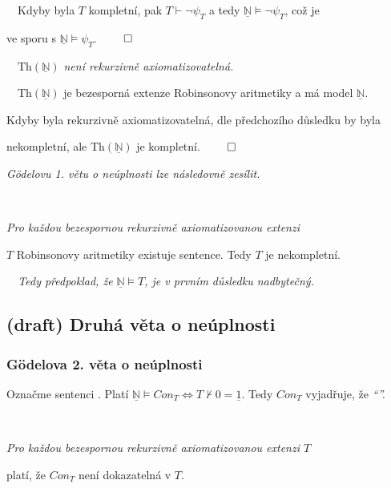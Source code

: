     \ \ Kdyby byla $T$ kompletní, pak $T\vdash \neg\psi_T$ a tedy $\underline{\mathbb{N}}\models \neg\psi_T$, což je
    \smallskip
    
    ve sporu s $\underline{\mathbb{N}}\models \psi_T$. $\qed$
    \bigskip
    
    \ \ {\it $\mathrm{Th}(\underline{\mathbb{N}})$ není rekurzivně axiomatizovatelná.}
    \medskip
    
    \ \ $\mathrm{Th}(\underline{\mathbb{N}})$ je bezesporná extenze Robinsonovy aritmetiky a má model $\underline{\mathbb{N}}$.
    \smallskip
    
    Kdyby byla rekurzivně axiomatizovatelná, dle předchozího důsledku by byla
    \smallskip
    
    nekompletní, ale $\mathrm{Th}(\underline{\mathbb{N}})$ je kompletní. $\qed$
    \bigskip
    
    {\it Gödelovu 1. větu o neúplnosti lze následovně zesílit.}
    \medskip
    
    \ \ {\it Pro každou bezespornou rekurzivně axiomatizovanou extenzi
    \smallskip
    
    $T$ Robinsonovy aritmetiky existuje  sentence. Tedy $T$ je nekompletní.}
    
    
    {\it {}\ \ Tedy předpoklad, že $\underline{\mathbb{N}}\models T$, je v prvním důsledku nadbytečný.}
    

\subsection{(draft) Druhá věta o neúplnosti}\todo

\subsubsection*{Gödelova 2. věta o neúplnosti}
    
    Označme  sentenci .
    \smallskip
    Platí $\underline{\mathbb{N}}\models Con_T \Leftrightarrow T\not\vdash 0=\underline{1}$. Tedy $Con_T$ vyjadřuje, že {\it ``''.}
    \medskip
    
    \smallskip
    
    \ \ {\it Pro každou bezespornou rekurzivně axiomatizovanou extenzi $T$
    
     platí, že $Con_T$ není dokazatelná v $T$.}
    \medskip
    
